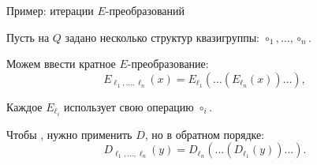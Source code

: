 

\begin{frame}{Пример: итерации $E$-преобразований}
    \begin{coloritemize}
        \item Пусть на $Q$ задано несколько структур квазигруппы: $\circ_1, \ldots, \circ_n$.
        \item Можем ввести кратное $E$-преобразование:
        \[
            E_{\ell_1, \ldots, \ell_n}(x) = E_{\ell_1} \left( \ldots \left( E_{\ell_n} (x) \right) \ldots \right), 
        \]
        \item Каждое $E_{\ell_i}$ использует свою операцию $\circ_i$.
        \pause
        \item Чтобы  , нужно применить $D$, но в обратном порядке:
        \[
            D_{\ell_1, \ldots, \ell_n}(y) = D_{\ell_n} \left( \ldots \left( D_{\ell_1} (y) \right) \ldots \right).
        \]
    \end{coloritemize}
\end{frame}


